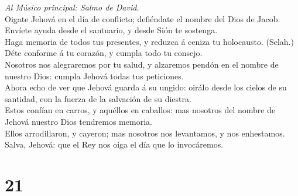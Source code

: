  \emph{Al Músico principal: Salmo de David.}\\
Oigate Jehová en el día de conflicto; defiéndate el nombre del Dios de
Jacob.\\
 Envíete ayuda desde el santuario, y desde Sión te
sostenga.\\
 Haga memoria de todos tus presentes, y reduzca á ceniza tu
holocausto. (Selah.)\\
 Déte conforme á tu corazón, y cumpla todo tu consejo.\\
 Nosotros nos alegraremos por tu salud, y alzaremos pendón
en el nombre de nuestro Dios: cumpla Jehová todas tus peticiones.\\
 Ahora echo de ver que Jehová guarda á su ungido: oirálo
desde los cielos de su santidad, con la fuerza de la salvación de su
diestra.\\
 Estos confían en carros, y aquéllos en caballos: mas
nosotros del nombre de Jehová nuestro Dios tendremos memoria.\\
 Ellos arrodillaron, y cayeron; mas nosotros nos levantamos,
y nos enhestamos.\\
 Salva, Jehová: que el Rey nos oiga el día que lo
invocáremos.

\hypertarget{section-20}{%
\section{21}\label{section-20}}

